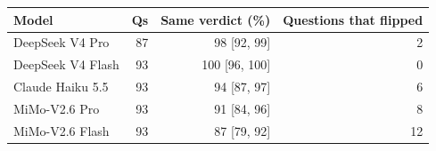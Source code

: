 \begin{tabular}{lrrr}
\toprule
Model & Qs & Same verdict (\%) & Questions that flipped \\
\midrule
DeepSeek V4 Pro & 87 & 98 [92, 99] & 2 \\
DeepSeek V4 Flash & 93 & 100 [96, 100] & 0 \\
Claude Haiku 5.5 & 93 & 94 [87, 97] & 6 \\
MiMo-V2.6 Pro & 93 & 91 [84, 96] & 8 \\
MiMo-V2.6 Flash & 93 & 87 [79, 92] & 12 \\
\bottomrule
\end{tabular}
